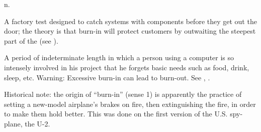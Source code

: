  n.

\begin{inparaenum}
\item A factory test designed to catch systems with 
    components before they get out the door; the theory is that burn-in will
    protect customers by outwaiting the steepest part of the  (see ).
\item A period of indeterminate length in which a person using a computer is so
    intensely involved in his project that he forgets basic needs such as food,
    drink, sleep, etc. Warning: Excessive burn-in can lead to burn-out. See
    , .
\end{inparaenum}

Historical note: the origin of ``burn-in'' (sense 1) is apparently the practice
of setting a new-model airplane's brakes on fire, then extinguishing the fire,
in order to make them hold better. This was done on the first version of the
U.S. spy-plane, the U-2.

